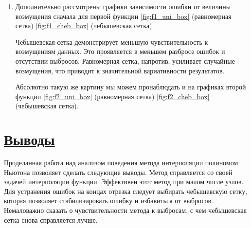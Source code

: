 \documentclass[14pt]{extarticle}
\begin{document}
\begin{enumerate}[label*=\arabic*), align=left, leftmargin=*, itemindent=1.5em, listparindent=1.5em, parsep=0pt]
		Для чебышевской сетки ошибка минимальна при 46 узле и составляет $4.85 \cdot 10^{-6}$.\\
		
		\item Дополнительно рассмотрены графики зависимости ошибки от величины возмущения сначала для первой функции \eqref{fig:f1_uni_box} (равномерная сетка) \eqref{fig:f1_cheb_box} (чебышевская сетка).
		
		Чебышевская сетка демонстрирует меньшую чувствительность к возмущениям данных. Это проявляется в меньшем разбросе ошибок и отсутствии выбросов. Равномерная сетка, напротив, усиливает случайные возмущения, что приводит к значительной вариативности результатов.
		
		Абсолютно такую же картину мы можем пронаблюдать и на графиках второй функции \eqref{fig:f2_uni_box} (равномерная сетка) \eqref{fig:f2_cheb_box} (чебышевская сетка).
	\end{enumerate}
	
	
	
	
	\newpage
	\section{\Large \underline{Выводы}}
	Проделанная работа над анализом поведения метода интерполяции полиномом Ньютона позволяет сделать следующие выводы. Метод справляется со своей задачей интерполяции функции. Эффективен этот метод при малом числе узлов. Для устранения ошибок на концах отрезка следует выбирать чебышевскую сетку, которая позволяет стабилизировать ошибку и избавиться от выбросов. Немаловажно сказать о чувствительности метода к выбросам, с чем чебышевская сетка снова справляется лучше.
	
	
\end{document}
